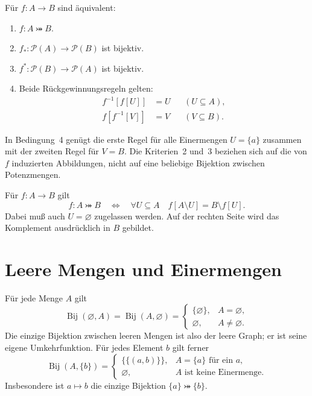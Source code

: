 \begin{theorem}
\label{b08guide:thm:powersetcriteria}
Für $f\colon A\to B$ sind äquivalent:
\begin{enumerate}
\item $f\colon A\bij B$.
\item $f_*\colon\mathcal P(A)\to\mathcal P(B)$ ist bijektiv.
\item $f^*\colon\mathcal P(B)\to\mathcal P(A)$ ist bijektiv.
\item Beide Rückgewinnungsregeln gelten:
\[
 \begin{aligned}
 f^{-1}[f[U]]&=U &&(U\subseteq A),\\
 f[f^{-1}[V]]&=V &&(V\subseteq B).
 \end{aligned}
\]
\end{enumerate}
In Bedingung~4 genügt die erste Regel für alle Einermengen
$U=\{a\}$ zusammen mit der zweiten Regel für $V=B$.
Die Kriterien~2 und~3 beziehen sich auf die von $f$ induzierten
Abbildungen, nicht auf eine beliebige Bijektion zwischen Potenzmengen.
\end{theorem}

\begin{theorem}
\label{b08guide:thm:complementcriteria}
Für $f\colon A\to B$ gilt
\[
 f\colon A\bij B
 \quad\Longleftrightarrow\quad
 \forall U\subseteq A\quad f[A\setminus U]=B\setminus f[U].
\]
Dabei muß auch $U=\varnothing$ zugelassen werden.
Auf der rechten Seite wird das Komplement ausdrücklich in $B$ gebildet.
\end{theorem}

\section{Leere Mengen und Einermengen}

\begin{theorem}
\label{b08guide:thm:empty}
Für jede Menge $A$ gilt
\[
 \operatorname{Bij}(\varnothing,A)
 =\operatorname{Bij}(A,\varnothing)
 =\begin{cases}
   \{\varnothing\},&A=\varnothing,\\
   \varnothing,&A\ne\varnothing.
  \end{cases}
\]
Die einzige Bijektion zwischen leeren Mengen ist also der leere Graph;
er ist seine eigene Umkehrfunktion. Für jedes Element $b$ gilt ferner
\[
 \operatorname{Bij}(A,\{b\})
 =\begin{cases}
   \{\{(a,b)\}\},& A=\{a\}\text{ für ein }a,\\
   \varnothing,& A\text{ ist keine Einermenge}.
  \end{cases}
\]
Insbesondere ist $a\mapsto b$ die einzige Bijektion
$\{a\}\bij\{b\}$.
\end{theorem}

